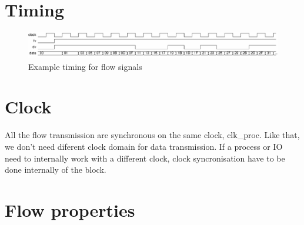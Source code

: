 \section{Timing}
\begin{figure}[h!]
\centering
\includegraphics[width=\textwidth]{wave.pdf}
\caption{Example timing for flow signals}
\end{figure}

\section{Clock}
All the flow transmission are synchronous on the same clock, clk\_proc. Like that, we don't need diferent clock domain for data transmission. If a process or IO need to internally work with a different clock, clock syncronisation have to be done internally of the block.

\section{Flow properties}

